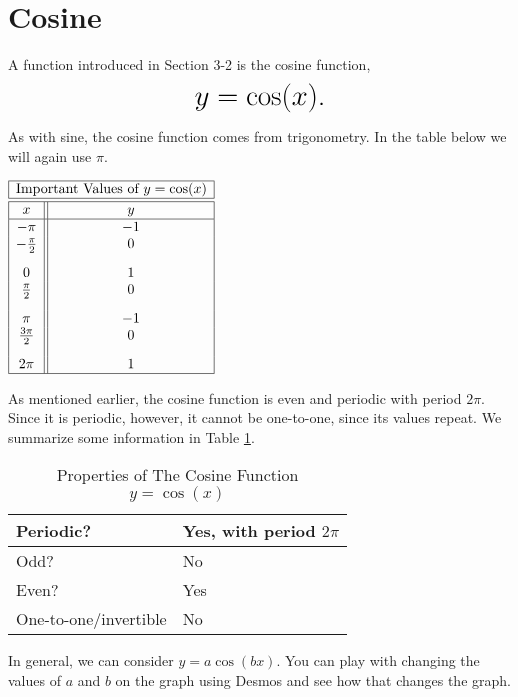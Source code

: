 \documentclass[nooutcomes]{ximera}
\begin{document}
\section{Cosine}
A function introduced in Section 3-2 is the cosine function, $$ \mbox{\huge $y=\cos(x)$.}$$ 


As with sine, the cosine function comes from trigonometry. In the table below we will again use $\pi$.

\begin{image}
\end{image}

\begin{center}
\(
\begin{array}{ |c || c|  }
 \hline
 \multicolumn{2}{|c|}{\text{\normalfont Important Values of } y=\cos(x)} \\
\hline
 \hline
 x & y\\
 \hline

 -\pi&-1\\

 -\frac{\pi}{2}&0\\[2ex]

 0&1\\

 \frac{\pi}{2}&0\\[2ex]

 \pi&-1\\

\frac{3\pi}{2}&0\\[2ex]

 2 \pi&1\\
\hline
\end{array}
\)
\end{center} 

As mentioned earlier, the cosine function is even and periodic with period $2\pi$. Since it is periodic, however, it cannot be one-to-one, since its values repeat. We summarize some information in Table \ref{tab:cosineproperties}.

\begin{table}[h]
\caption{\label{tab:cosineproperties}Properties of The Cosine Function $y = \cos(x)$}
\centering
\begin{tabular}{l|l}
Periodic? & Yes, with period $2\pi$ \\ \hline
Odd? &  No \\ \hline
Even? & Yes \\ \hline
One-to-one/invertible & No
\end{tabular}
\end{table}

In general, we can consider $y=a\cos(bx)$.  You can play with changing the values of $a$ and $b$ on the graph using Desmos and see how that changes the graph.  

\begin{center}  
\end{center}
\end{document}
